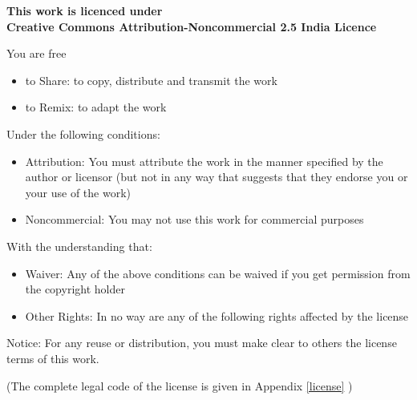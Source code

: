 

\begin{center}
\textbf{This work is licenced under \\ Creative Commons Attribution-Noncommercial 2.5 India Licence}\end{center}


You are free 
\begin{itemize}
 \item {to Share: to copy, distribute and transmit the work}
  \item{to Remix: to adapt the work}
\end{itemize}

\vspace{0.25in}


Under the following conditions:

\begin{itemize}
 \item { Attribution: You must attribute the work in the manner specified by the author or licensor (but not in any way that suggests that they endorse you or your use of the work)}
  \item{Noncommercial: You may not use this work for commercial purposes}
\end{itemize}
     
\vspace{0.25in}
With the understanding that:
\begin{itemize}
 \item {Waiver: Any of the above conditions can be waived if you get permission from the copyright holder}
  \item{Other Rights: In no way are any of the following rights affected by the license}
\end{itemize}

Notice: For any reuse or distribution, you must make clear to others the license terms of this work. 

\begin{flushleft}
(The complete legal code of the license is given in Appendix \ref{license} ) 
\end{flushleft}




